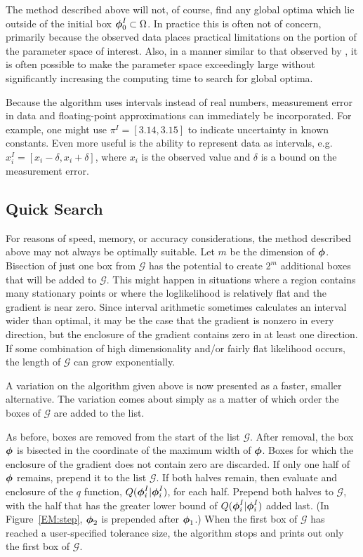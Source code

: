 The method described above will not, of course, find any global optima which
lie outside of the initial box $\mbox{\boldmath $\phi$}_0^I \subset \Omega$.  
In practice this is often not of
concern, primarily because the observed data places practical limitations on
the portion of the parameter space of interest.
Also, in a manner similar to that observed by \cite{HansenBook}, 
it is often possible to make the parameter space exceedingly large without
significantly increasing the computing time to search for global optima.

Because the algorithm uses intervals instead of real numbers, measurement
error in data and floating-point approximations can immediately be
incorporated.  For example, one might use $\pi^I=[3.14,3.15]$ to indicate
uncertainty in known constants.  Even more useful is the ability to represent
data as intervals, e.g. $x^I_i = [x_i - \delta, x_i + \delta]$, where
$x_i$ is the observed value and $\delta$ is a bound on the measurement error.

\subsection{Quick Search}

For reasons of speed, memory, or accuracy considerations, the method described
above may not always be optimally suitable.  Let $m$ be the
dimension of $\mbox{\boldmath $\phi$}$. Bisection of just one box from
$\mathcal{G}$ has the potential to create $2^m$ additional boxes
that will be added to $\mathcal{G}$.  This might happen
in situations where a region contains many stationary points or
where the loglikelihood is relatively flat and the gradient is near
zero.  Since interval arithmetic sometimes calculates an interval
wider than optimal, it may be the case that the gradient is nonzero
in every direction, but the enclosure of the gradient contains zero
in at least one direction.  If some combination of high
dimensionality and/or fairly flat likelihood 
occurs, the length of $\mathcal{G}$ can grow exponentially.

  A variation on the algorithm given above is now presented as a
faster, smaller alternative.  The variation comes about simply as a
matter of which order the boxes of $\mathcal{G}$ are added to the
list.

  As before, boxes are removed from the start of the list
$\mathcal{G}$.  After removal, the box $\mbox{\boldmath $\phi$}$ is bisected in the
coordinate of the maximum width of $\mbox{\boldmath $\phi$}$.  Boxes for which the
enclosure of the gradient does not contain zero are discarded.  If
only one half of $\mbox{\boldmath $\phi$}$ remains, prepend it to the list
$\mathcal{G}$.  If both halves remain, then evaluate and enclosure of the $q$
function, 
$Q(\mbox{\boldmath $\phi$}_i^I|\mbox{\boldmath $\phi$}_i^I)$, for each half.  Prepend both halves to
$\mathcal{G}$, with the half that has the greater lower bound of
$Q(\mbox{\boldmath $\phi$}_i^I|\mbox{\boldmath $\phi$}_i^I)$ added last.  (In Figure~\ref{EM:step},
$\mbox{\boldmath $\phi$}_{2}$ is prepended after $\mbox{\boldmath $\phi$}_{1}$.)
When the first box of $\mathcal{G}$ has
reached a user-specified tolerance size, the algorithm stops and
prints out only the first box of $\mathcal{G}$.

